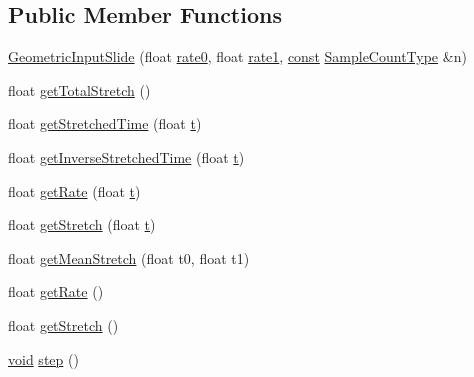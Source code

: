 \subsection*{Public Member Functions}
\begin{DoxyCompactItemize}
\item 
\hyperlink{class__sbsms___1_1_geometric_input_slide_a1f94552ec2115b290e0db8d50671f432}{Geometric\+Input\+Slide} (float \hyperlink{class__sbsms___1_1_geometric_input_slide_aaa8047cc4f1d52ff660065807225ef74}{rate0}, float \hyperlink{class__sbsms___1_1_geometric_input_slide_a79ed8d34b422f99a09b97805a26cb845}{rate1}, \hyperlink{getopt1_8c_a2c212835823e3c54a8ab6d95c652660e}{const} \hyperlink{namespace__sbsms___ae4ba47977e7e07f5945e529e2256b662}{Sample\+Count\+Type} \&n)
\item 
float \hyperlink{class__sbsms___1_1_geometric_input_slide_aa7d2aaf421c731f9e757b8bee9d07e44}{get\+Total\+Stretch} ()
\item 
float \hyperlink{class__sbsms___1_1_geometric_input_slide_aa36f81191eb8cc64379eeb53d06b1a23}{get\+Stretched\+Time} (float \hyperlink{octave__test_8m_aaccc9105df5383111407fd5b41255e23}{t})
\item 
float \hyperlink{class__sbsms___1_1_geometric_input_slide_adf65f60bc8058b202ec739f6e831a5d6}{get\+Inverse\+Stretched\+Time} (float \hyperlink{octave__test_8m_aaccc9105df5383111407fd5b41255e23}{t})
\item 
float \hyperlink{class__sbsms___1_1_geometric_input_slide_a2d11fd52b2827496908fe87ba77bd285}{get\+Rate} (float \hyperlink{octave__test_8m_aaccc9105df5383111407fd5b41255e23}{t})
\item 
float \hyperlink{class__sbsms___1_1_geometric_input_slide_a011718e49cfdeb888d05879ec7a7d0f0}{get\+Stretch} (float \hyperlink{octave__test_8m_aaccc9105df5383111407fd5b41255e23}{t})
\item 
float \hyperlink{class__sbsms___1_1_geometric_input_slide_a224f9803046d990db0bf8dbe743b9f51}{get\+Mean\+Stretch} (float t0, float t1)
\item 
float \hyperlink{class__sbsms___1_1_geometric_input_slide_a58294d73d651da753c3234a29500f600}{get\+Rate} ()
\item 
float \hyperlink{class__sbsms___1_1_geometric_input_slide_a3e00087f82c11f7e0c92014c26879a40}{get\+Stretch} ()
\item 
\hyperlink{sound_8c_ae35f5844602719cf66324f4de2a658b3}{void} \hyperlink{class__sbsms___1_1_geometric_input_slide_ab7f69ee850da367bf99b76c0cdd417d4}{step} ()
\end{DoxyCompactItemize}
